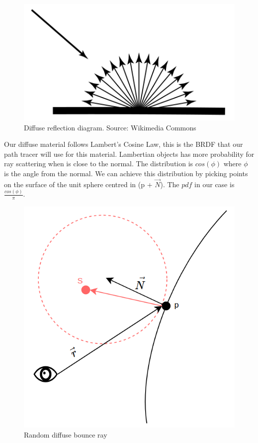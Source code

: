 \documentclass[titlepage,12pt]{report}
\begin{document}
\begin{figure}[!ht]
	\centering
	\includegraphics[scale=0.35]{media/Diffuse_Reflection.png}
	\caption{Diffuse reflection diagram. Source: Wikimedia Commons}
	\label{diff1}
\end{figure}

Our diffuse material follows Lambert's Cosine Law, this is the BRDF that our path tracer will use for this material. Lambertian objects has more probability for ray scattering when is close to the normal. The distribution is $cos(\phi)$ where $\phi$ is the angle from the normal. We can achieve this distribution by picking points on the surface of the unit sphere centred in (p + $\vec{N}$). The $pdf$ in our case is $\frac{cos(\phi)}{\pi}$.

\begin{figure}[!ht]
	\centering
	\includegraphics[scale=0.35]{media/random_ray.png}
	\caption{Random diffuse bounce ray}
	\label{diff2}
\end{figure}
\end{document}
